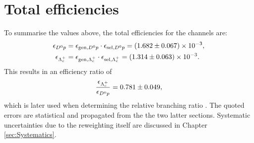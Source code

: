 \section{Total efficiencies}
To summarise the values above, the total efficiencies for the channels are:
\begin{align*}
    \effDp &= \effGenDp \cdot \effSelDp = \num[scientific-notation=true]{\effDpval \pm \effDperr}, \\
    \effLc &= \effGenLc \cdot \effSelLc = \num[scientific-notation=true]{\effLcval \pm \effLcerr}.
\end{align*}
This results in an efficiency ratio of
\begin{align*}
    \frac{\effLc}{\effDp} = \effRatioval \pm \effRatioerr,
\end{align*}
which is later used when determining the relative branching ratio \R.
The quoted errors are statistical and propagated from the the two latter sections.
Systematic uncertainties due to the reweighting itself are discussed in Chapter \ref{sec:Systematics}.
